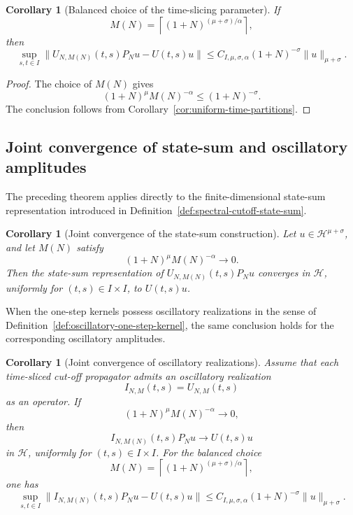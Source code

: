 \documentclass[11pt]{amsart}
\theoremstyle{plain}
\newtheorem{corollary}[theorem]{Corollary}
\theoremstyle{definition}
\theoremstyle{remark}
\newcommand{\Hilb}{\mathcal H}
\begin{document}
\begin{corollary}[Balanced choice of the time-slicing parameter]
\label{cor:balanced-time-slicing}
If
\[
 M(N)=
 \left\lceil(1+N)^{(\mu+\sigma)/\alpha}\right\rceil,
\]
then
\[
 \sup_{s,t\in I}
 \|U_{N,M(N)}(t,s)P_Nu-U(t,s)u\|
 \leq
 C_{I,\mu,\sigma,\alpha}(1+N)^{-\sigma}
 \|u\|_{\mu+\sigma}.
\]
\end{corollary}

\begin{proof}
The choice of \(M(N)\) gives
\[
 (1+N)^\mu M(N)^{-\alpha}
 \leq (1+N)^{-\sigma}.
\]
The conclusion follows from
Corollary~\ref{cor:uniform-time-partitions}.
\end{proof}

\subsection{Joint convergence of state-sum and oscillatory amplitudes}
\label{subsec:joint-convergence-amplitudes}

The preceding theorem applies directly to the finite-dimensional state-sum
representation introduced in
Definition~\ref{def:spectral-cutoff-state-sum}.

\begin{corollary}[Joint convergence of the state-sum construction]
\label{cor:joint-state-sum-convergence}
Let \(u\in\Hilb^{\mu+\sigma}\), and let \(M(N)\) satisfy
\[
 (1+N)^\mu M(N)^{-\alpha}\longrightarrow0.
\]
Then the state-sum representation of
\(U_{N,M(N)}(t,s)P_Nu\) converges in \(\Hilb\), uniformly for
\((t,s)\in I\times I\), to \(U(t,s)u\).
\end{corollary}

When the one-step kernels possess oscillatory realizations in the sense of
Definition~\ref{def:oscillatory-one-step-kernel}, the same conclusion holds
for the corresponding oscillatory amplitudes.

\begin{corollary}[Joint convergence of oscillatory realizations]
\label{cor:joint-oscillatory-convergence}
Assume that each time-sliced cut-off propagator admits an oscillatory
realization
\[
 I_{N,M}(t,s)=U_{N,M}(t,s)
\]
as an operator. If
\[
 (1+N)^\mu M(N)^{-\alpha}\longrightarrow0,
\]
then
\[
 I_{N,M(N)}(t,s)P_Nu
 \longrightarrow U(t,s)u
\]
in \(\Hilb\), uniformly for \((t,s)\in I\times I\).
For the balanced choice
\[
 M(N)=\left\lceil(1+N)^{(\mu+\sigma)/\alpha}\right\rceil,
\]
one has
\[
 \sup_{s,t\in I}
 \|I_{N,M(N)}(t,s)P_Nu-U(t,s)u\|
 \leq
 C_{I,\mu,\sigma,\alpha}(1+N)^{-\sigma}
 \|u\|_{\mu+\sigma}.
\]
\end{corollary}
\end{document}
